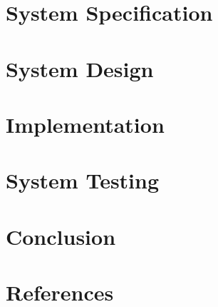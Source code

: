\documentclass[a4paper, 12pt]{article}
\begin{document}
\newpage
\section{System Specification}



\newpage
\section{System Design}



\newpage
\section{Implementation}



\newpage
\section{System Testing}



\newpage
\section{Conclusion}



\newpage
\section{References}
\end{document}
